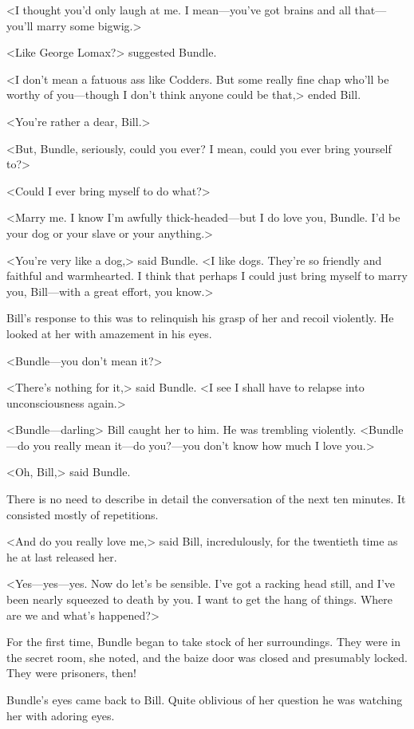 <I thought you'd only laugh at me. I mean—you've got brains and all that—you'll marry some bigwig.>

<Like George Lomax?> suggested Bundle.

<I don't mean a fatuous ass like Codders. But some really fine chap who'll be worthy of you—though I don't think anyone could be that,> ended Bill.

<You're rather a dear, Bill.>

<But, Bundle, seriously, could you ever? I mean, could you ever bring yourself to?>

<Could I ever bring myself to do what?>

<Marry me. I know I'm awfully thick-headed—but I do love you, Bundle. I'd be your dog or your slave or your anything.>

<You're very like a dog,> said Bundle. <I like dogs. They're so friendly and faithful and warmhearted. I think that perhaps I could just bring myself to marry you, Bill—with a great effort, you know.>

Bill's response to this was to relinquish his grasp of her and recoil violently. He looked at her with amazement in his eyes.

<Bundle—you don't mean it?>

<There's nothing for it,> said Bundle. <I see I shall have to relapse into unconsciousness again.>

<Bundle—darling\longdash> Bill caught her to him. He was trembling violently. <Bundle—do you really mean it—do you?—you don't know how much I love you.>

<Oh, Bill,> said Bundle.

There is no need to describe in detail the conversation of the next ten minutes. It consisted mostly of repetitions.

<And do you really love me,> said Bill, incredulously, for the twentieth time as he at last released her.

<Yes—yes—yes. Now do let's be sensible. I've got a racking head still, and I've been nearly squeezed to death by you. I want to get the hang of things. Where are we and what's happened?>

For the first time, Bundle began to take stock of her surroundings. They were in the secret room, she noted, and the baize door was closed and presumably locked. They were prisoners, then!

Bundle's eyes came back to Bill. Quite oblivious of her question he was watching her with adoring eyes.

